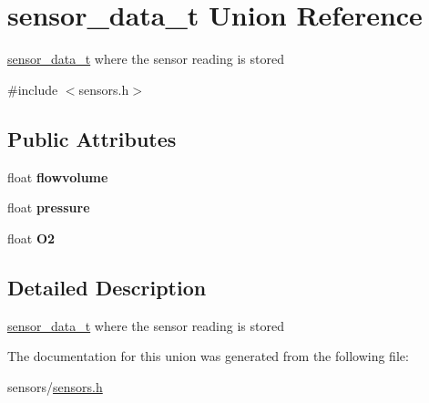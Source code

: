 \hypertarget{unionsensor__data__t}{}\section{sensor\+\_\+data\+\_\+t Union Reference}
\label{unionsensor__data__t}


\hyperlink{unionsensor__data__t}{sensor\+\_\+data\+\_\+t} where the sensor reading is stored  




{\ttfamily \#include $<$sensors.\+h$>$}

\subsection*{Public Attributes}
\begin{DoxyCompactItemize}
\item 
\mbox{\label{unionsensor__data__t_a1a6b259f81f82b8d628e0477ce94552d}} 
float {\bfseries flowvolume}
\item 
\mbox{\label{unionsensor__data__t_ae2de45a1fff067e9e1a3b1ac2a4c22b8}} 
float {\bfseries pressure}
\item 
\mbox{\label{unionsensor__data__t_a9968588012648c3cd9121ae948fbe812}} 
float {\bfseries O2}
\end{DoxyCompactItemize}


\subsection{Detailed Description}
\hyperlink{unionsensor__data__t}{sensor\+\_\+data\+\_\+t} where the sensor reading is stored 

The documentation for this union was generated from the following file\+:\begin{DoxyCompactItemize}
\item 
sensors/\hyperlink{sensors_8h}{sensors.\+h}\end{DoxyCompactItemize}

